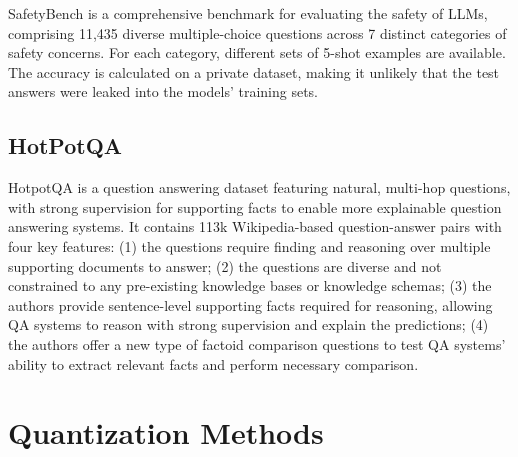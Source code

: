 SafetyBench is a comprehensive benchmark for evaluating the safety of LLMs, comprising 11,435 diverse multiple-choice questions across 7 distinct categories of safety concerns. For each category, different sets of 5-shot examples are available. The accuracy is calculated on a private dataset, making it unlikely that the test answers were leaked into the models' training sets.

\subsection{HotPotQA}

HotpotQA is a question answering dataset featuring natural, multi-hop questions, with strong supervision for supporting facts to enable more explainable question answering systems. It contains 113k Wikipedia-based question-answer pairs with four key features: (1) the questions require finding and reasoning over multiple supporting documents to answer; (2) the questions are diverse and not constrained to any pre-existing knowledge bases or knowledge schemas; (3) the authors provide sentence-level supporting facts required for reasoning, allowing QA systems to reason with strong supervision and explain the predictions; (4) the authors offer a new type of factoid comparison questions to test QA systems' ability to extract relevant facts and perform necessary comparison.

\section{Quantization Methods}
\label{app:methods}

